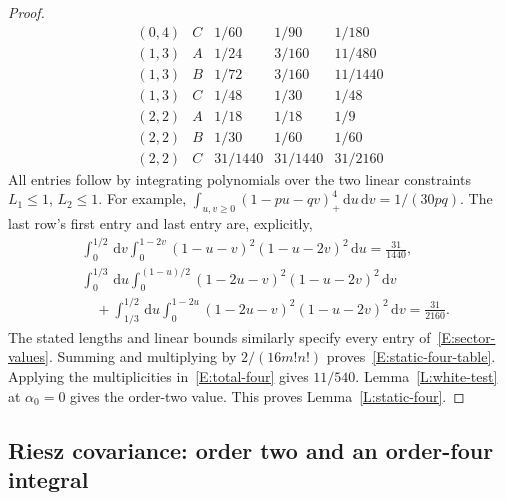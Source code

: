 \documentclass[12pt]{article}
\numberwithin{equation}{section}
\theoremstyle{definition}
\newcommand{\ud}{\,\mathrm{d}}
\begin{document}
\begin{proof}
\begin{equation}
\begin{array}{c|c|ccc}
      (0,4)&C&1/60&1/90&1/180\\
      (1,3)&A&1/24&3/160&11/480\\
      (1,3)&B&1/72&3/160&11/1440\\
      (1,3)&C&1/48&1/30&1/48\\
      (2,2)&A&1/18&1/18&1/9\\
      (2,2)&B&1/30&1/60&1/60\\
      (2,2)&C&31/1440&31/1440&31/2160
    \end{array}
  \end{equation}
  All entries follow by integrating polynomials over the two linear
  constraints $L_1\le1$, $L_2\le1$. For example,
  $\int_{u,v\ge0}(1-pu-qv)_+^4\ud u\ud v=1/(30pq)$.
  The last row's first entry and last entry are, explicitly,
  \[
    \begin{split}
      &\int_0^{1/2}\ud v\int_0^{1-2v}
      (1-u-v)^2(1-u-2v)^2\ud u=\frac{31}{1440},\\
      &\int_0^{1/3}\ud u\int_0^{(1-u)/2}
      (1-2u-v)^2(1-u-2v)^2\ud v\\
      &\quad+\int_{1/3}^{1/2}\ud u\int_0^{1-2u}
      (1-2u-v)^2(1-u-2v)^2\ud v=\frac{31}{2160}.
    \end{split}
  \]
  The stated lengths and linear bounds similarly specify every entry
  of~\eqref{E:sector-values}. Summing and multiplying by
  $2/(16m!n!)$ proves~\eqref{E:static-four-table}. Applying the
  multiplicities in~\eqref{E:total-four} gives $11/540$.
  Lemma~\ref{L:white-test} at $\alpha_0=0$ gives the order-two value.
  This proves Lemma~\ref{L:static-four}.
\end{proof}

\subsection{Riesz covariance: order two and an order-four integral}
\end{document}
